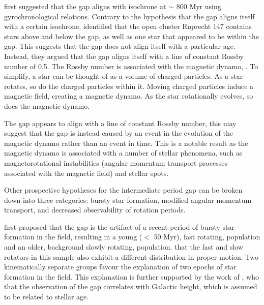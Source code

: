 \citet{reinhold_transition_2019} first suggested that the gap aligns with isochrone at $\sim$ 800 Myr using \citet{barnes_simple_2010} gyrochronological relations.
Contrary to the hypothesis that the gap aligns itself with a certain isochrone, \citet{curtis_when_2020} identified that the open cluster Ruprecht 147 contains stars above and below the gap, as well as one star that appeared to be within the gap.
This suggests that the gap does not align itself with a particular age.
Instead, they argued that the gap aligns itself with a line of constant Rossby number of 0.5.
The Rossby number is associated with the magnetic dynamo, \citep[see, e.g.,][]{noyes_rotation_1984, montesinos_new_2001, augustson_rossby_2019}.
To simplify, a star can be thought of as a volume of charged particles.
As a star rotates, so do the charged particles within it.
Moving charged particles induce a magnetic field, creating a magnetic dynamo.
As the star rotationally evolves, so does the magnetic dynamo.

The gap appears to align with a line of constant Rossby number, this may suggest that the gap is instead caused by an event in the evolution of the magnetic dynamo rather than an event in time.
This is a notable result as the magnetic dynamo is associated with a number of stellar phenomena, such as magnetorotational instabilities (angular momentum transport processes associated with the magnetic field) and stellar spots.

Other prospective hypotheses for the intermediate period gap can be broken down into three categories: bursty star formation, modified angular momentum transport, and decreased observability of rotation periods.

\citet{mcquillan_rotation_2014, davenport_rotating_2017} first proposed that the gap is the artifact of a recent period of bursty star formation in the \kepler{} field, resulting in a young ($<$ 50 Myr), fast rotating, population and an older, background slowly rotating, population.
\citet{davenport_rotating_2017}  that the fast and slow rotators in this sample also exhibit a different distribution in proper motion. 
Two kinematically separate groups  favour the explanation of two epochs of star formation in the \kepler{} field. 
This explanation is further supported by the work of \citet{davenport_rotating_2018}, who  that the observation of the gap correlates with Galactic height, which is assumed to be related to stellar age.

